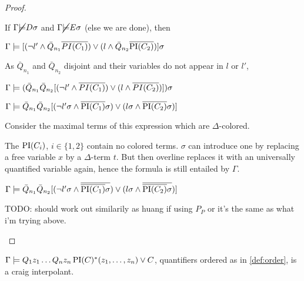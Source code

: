 \documentclass[,%
	paper=a4,%
	DIV20, 
	liststotoc,
	bibtotoc,
	draft=false,%
	numbers=noendperiod
]{scrartcl}
\begin{document}
\begin{proof}
\begin{enumerate}
			If $\Gamma \cancel {\models} D \sigma$ and 
			$\Gamma \cancel {\models} E \sigma$ (else we are done), then  

			$\Gamma \models [ (\lnot l' \land \bar Q_{n_1} \overline{PI(C_1)}) \lor (l \land \bar Q_{n_2} \overline{\operatorname{PI}(C_2)}) ] \sigma$

			As $\bar Q_{n_1}$ and $\bar Q_{n_2}$ disjoint and their variables do not appear in $l$ or $l'$,

			$\Gamma \models (\bar Q_{n_1} \bar Q_{n_2} [ (\lnot l' \land  \overline{PI(C_1)}) \lor (l \land \overline{PI(C_2)}) ] ) \sigma$

			$\Gamma \models \bar Q_{n_1} \bar Q_{n_2} [ (\lnot l'\sigma \land  \overline{\operatorname{PI}(C_1)}\sigma) \lor (l\sigma \land \overline{\operatorname{PI}(C_2)}\sigma) ] $

			Consider the maximal terms of this expression which are $\Delta$-colored.

			The $\operatorname{PI}(C_i)$, $i \in \{1,2\}$ contain no colored terms. $\sigma$ can introduce one by replacing a free variable $x$ by a $\Delta$-term $t$. But then overline replaces it with an universally quantified variable again, hence the formula is still entailed by $\Gamma$.

			$\Gamma \models \bar Q_{n_1} \bar Q_{n_2} [ (\lnot l'\sigma \land  \overline{\overline{\operatorname{PI}(C_1)}\sigma}) \lor (l\sigma \land \overline{\overline{\operatorname{PI}(C_2)}\sigma}) ] $



			TODO: should work out similarily as huang if using $P_P$ or it's the same as what i'm trying above.

	\end{enumerate}
\end{proof}



\begin{prop}
	$\Gamma \models Q_1 z_1 \ldots Q_n z_n \operatorname{PI}(C)^*(z_1, \ldots, z_n)  \lor C$, quantifiers ordered as in \ref{def:order}, is a craig interpolant.
\end{prop}
\end{document}
